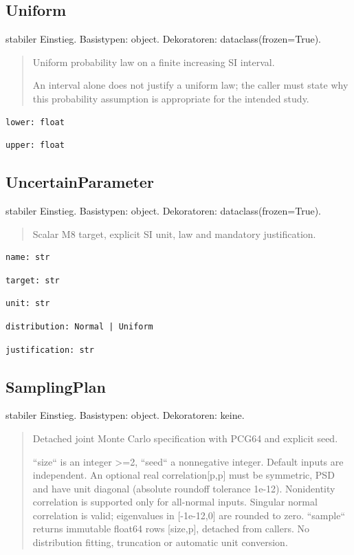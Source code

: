 \subsection{Uniform}
stabiler Einstieg.
Basistypen: object. Dekoratoren: dataclass(frozen=True).
\begin{quote}
Uniform probability law on a finite increasing SI interval.\par An interval alone does not justify a uniform law; the caller must state why this probability assumption is appropriate for the intended study.
\end{quote}
\begin{lstlisting}
lower: float
\end{lstlisting}
\begin{lstlisting}
upper: float
\end{lstlisting}
\subsection{UncertainParameter}
stabiler Einstieg.
Basistypen: object. Dekoratoren: dataclass(frozen=True).
\begin{quote}
Scalar M8 target, explicit SI unit, law and mandatory justification.
\end{quote}
\begin{lstlisting}
name: str
\end{lstlisting}
\begin{lstlisting}
target: str
\end{lstlisting}
\begin{lstlisting}
unit: str
\end{lstlisting}
\begin{lstlisting}
distribution: Normal | Uniform
\end{lstlisting}
\begin{lstlisting}
justification: str
\end{lstlisting}
\subsection{SamplingPlan}
stabiler Einstieg.
Basistypen: object. Dekoratoren: keine.
\begin{quote}
Detached joint Monte Carlo specification with PCG64 and explicit seed.\par ``size`` is an integer >=2, ``seed`` a nonnegative integer. Default inputs are independent. An optional real correlation[p,p] must be symmetric, PSD and have unit diagonal (absolute roundoff tolerance 1e-12). Nonidentity correlation is supported only for all-normal inputs. Singular normal correlation is valid; eigenvalues in [-1e-12,0] are rounded to zero. ``sample`` returns immutable float64 rows [size,p], detached from callers. No distribution fitting, truncation or automatic unit conversion.
\end{quote}
